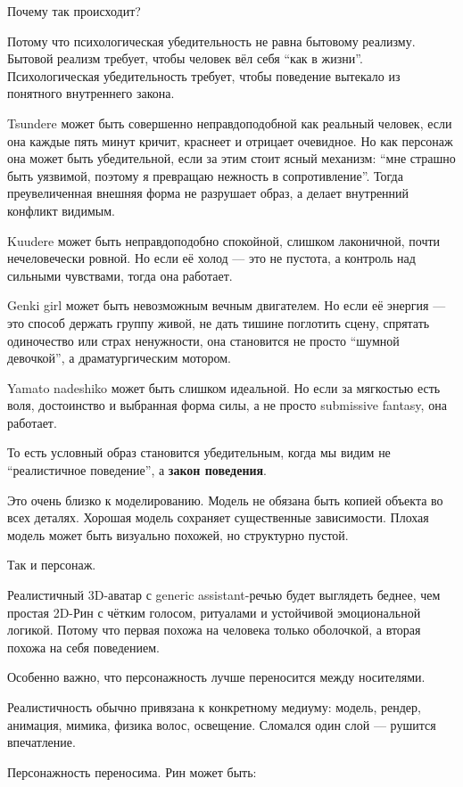 Почему так происходит?

Потому что психологическая убедительность не равна бытовому реализму.
Бытовой реализм требует, чтобы человек вёл себя ``как в жизни''.
Психологическая убедительность требует, чтобы поведение вытекало из
понятного внутреннего закона.

Tsundere может быть совершенно неправдоподобной как реальный человек,
если она каждые пять минут кричит, краснеет и отрицает очевидное. Но как
персонаж она может быть убедительной, если за этим стоит ясный механизм:
``мне страшно быть уязвимой, поэтому я превращаю нежность в
сопротивление''. Тогда преувеличенная внешняя форма не разрушает образ,
а делает внутренний конфликт видимым.

Kuudere может быть неправдоподобно спокойной, слишком лаконичной, почти
нечеловечески ровной. Но если её холод --- это не пустота, а контроль
над сильными чувствами, тогда она работает.

Genki girl может быть невозможным вечным двигателем. Но если её энергия
--- это способ держать группу живой, не дать тишине поглотить сцену,
спрятать одиночество или страх ненужности, она становится не просто
``шумной девочкой'', а драматургическим мотором.

Yamato nadeshiko может быть слишком идеальной. Но если за мягкостью есть
воля, достоинство и выбранная форма силы, а не просто submissive
fantasy, она работает.

То есть условный образ становится убедительным, когда мы видим не
``реалистичное поведение'', а \textbf{закон поведения}.

Это очень близко к моделированию. Модель не обязана быть копией объекта
во всех деталях. Хорошая модель сохраняет существенные зависимости.
Плохая модель может быть визуально похожей, но структурно пустой.

Так и персонаж.

Реалистичный 3D-аватар с generic assistant-речью будет выглядеть беднее,
чем простая 2D-Рин с чётким голосом, ритуалами и устойчивой
эмоциональной логикой. Потому что первая похожа на человека только
оболочкой, а вторая похожа на себя поведением.

Особенно важно, что персонажность лучше переносится между носителями.

Реалистичность обычно привязана к конкретному медиуму: модель, рендер,
анимация, мимика, физика волос, освещение. Сломался один слой ---
рушится впечатление.

Персонажность переносима. Рин может быть:

